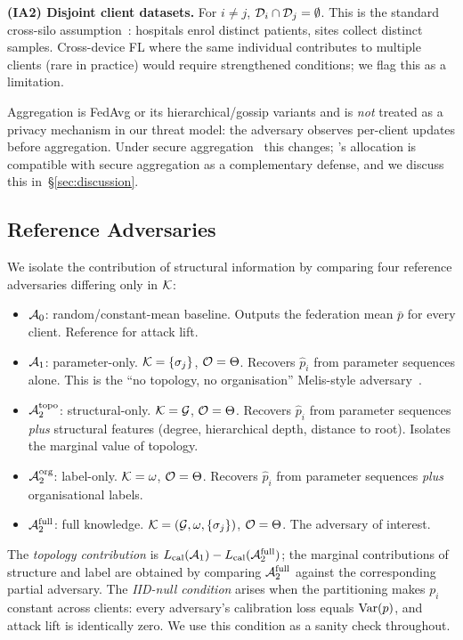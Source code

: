 \textbf{(IA2) Disjoint client datasets.} For $i \neq j$,
$\mathcal{D}_i \cap \mathcal{D}_j = \emptyset$. This is the standard cross-silo
assumption~\cite{flamby2022,sheller2020medicine}: hospitals enrol
distinct patients, sites collect distinct samples. Cross-device FL
where the same individual contributes to multiple clients (rare in
practice) would require strengthened conditions; we flag this as a
limitation.

Aggregation is FedAvg or its hierarchical/gossip variants and is
\emph{not} treated as a privacy mechanism in our threat model: the
adversary observes per-client updates before aggregation. Under secure
aggregation~\cite{bonawitz2017secagg} this changes; \Fulcrum's
allocation is compatible with secure aggregation as a complementary
defense, and we discuss this in~\S\ref{sec:discussion}.

\subsection{Reference Adversaries}
\label{sec:reference-adv}

We isolate the contribution of structural information by comparing four
reference adversaries differing only in $\mathcal{K}$:

\begin{itemize}[topsep=2pt,itemsep=2pt,leftmargin=*]
\item $\mathcal{A}_0$: random/constant-mean baseline. Outputs the federation
  mean $\bar p$ for every client. Reference for attack lift.
\item $\mathcal{A}_1$: parameter-only.
  $\mathcal{K} = \{\sigma_j\}$, $\mathcal{O} = \Theta$.
  Recovers $\hat p_i$ from parameter sequences alone. This is the
  ``no topology, no organisation'' Melis-style adversary~\cite{melis2019exploiting}.
\item $\mathcal{A}_2^{\text{topo}}$: structural-only.
  $\mathcal{K}=\mathcal{G}$, $\mathcal{O}=\Theta$.
  Recovers $\hat p_i$ from parameter sequences \emph{plus} structural
  features (degree, hierarchical depth, distance to root). Isolates
  the marginal value of topology.
\item $\mathcal{A}_2^{\text{org}}$: label-only.
  $\mathcal{K}=\omega$, $\mathcal{O}=\Theta$.
  Recovers $\hat p_i$ from parameter sequences \emph{plus}
  organisational labels.
\item $\mathcal{A}_2^{\text{full}}$: full knowledge.
  $\mathcal{K} = (\mathcal{G},\omega,\{\sigma_j\})$, $\mathcal{O}=\Theta$.
  The adversary of interest.
\end{itemize}

The \emph{topology contribution} is $L_{\text{cal}}(\mathcal{A}_1) - L_{\text{cal}}(\mathcal{A}_2^{\text{full}})$;
the marginal contributions of structure and label are obtained by
comparing $\mathcal{A}_2^{\text{full}}$ against the corresponding partial
adversary. The \emph{IID-null condition} arises when the partitioning
makes $p_i$ constant across clients: every adversary's calibration
loss equals $\mathrm{Var}(p)$, and attack lift is identically zero. We use
this condition as a sanity check throughout.
